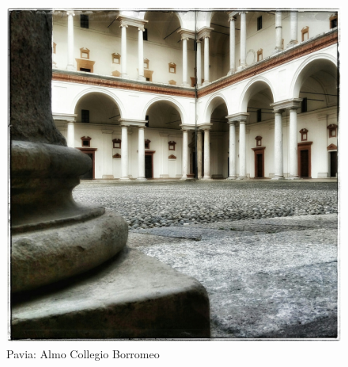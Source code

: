 \documentclass[nols]{tufte-handout}
\begin{document}
\begin{figure}[!b]
  \includegraphics[width=0.8\linewidth]{thumb-lesson_II.jpeg}
  \caption{Pavia: Almo Collegio Borromeo}
  \label{fig:textfig}
\end{figure}

 


\end{document}

